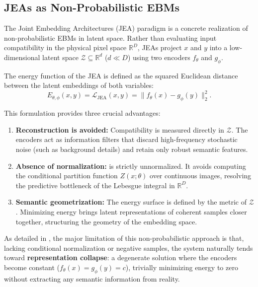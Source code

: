 \documentclass[11pt, oneside, openany]{book}
\begin{document}
\subsection{JEAs as Non-Probabilistic EBMs}
\label{sec:2.5.2}

The Joint Embedding Architectures (JEA) paradigm is a concrete realization of non-probabilistic EBMs in latent space. Rather than evaluating input compatibility in the physical pixel space $\mathbb{R}^{D}$, JEAs project $x$ and $y$ into a low-dimensional latent space $\mathcal{Z} \subseteq \mathbb{R}^{d}$ ($d \ll D$) using two encoders $f_{\theta}$ and $g_{\phi}$.

The energy function of the JEA is defined as the squared Euclidean distance between the latent embeddings of both variables:
\begin{equation}
\label{eq:2.14}
E_{\theta,\phi}(x,y) = \mathcal{L}_{\text{JEA}}(x,y) = \lVert f_{\theta}(x) - g_{\phi}(y) \rVert_{2}^{2}.
\end{equation}

This formulation provides three crucial advantages:
\begin{enumerate}
    \item \textbf{Reconstruction is avoided:} Compatibility is measured directly in $\mathcal{Z}$. The encoders act as information filters that discard high-frequency stochastic noise (such as background details) and retain only robust semantic features.
    \item \textbf{Absence of normalization:}  is strictly unnormalized. It avoids computing the conditional partition function $Z(x;\theta)$ over continuous images, resolving the predictive bottleneck of the Lebesgue integral in $\mathbb{R}^{D}$.
    \item \textbf{Semantic geometrization:} The energy surface is defined by the metric of $\mathcal{Z}$. Minimizing energy brings latent representations of coherent samples closer together, structuring the geometry of the embedding space.
\end{enumerate}

As detailed in , the major limitation of this non-probabilistic approach is that, lacking conditional normalization or negative samples, the system naturally tends toward \textbf{representation collapse}: a degenerate solution where the encoders become constant ($f_{\theta}(x) = g_{\phi}(y) = c$), trivially minimizing energy to zero without extracting any semantic information from reality.
\end{document}
